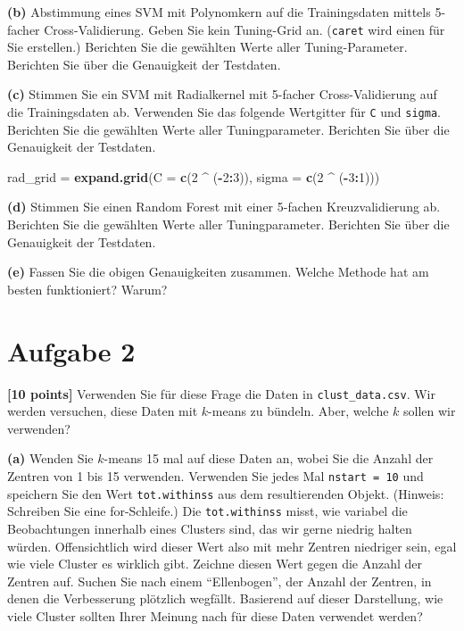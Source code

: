 \documentclass[]{article}
\newenvironment{Shaded}{\begin{snugshade}}{\end{snugshade}}
\newcommand{\DataTypeTok}[1]{\textcolor[rgb]{0.13,0.29,0.53}{#1}}
\newcommand{\DecValTok}[1]{\textcolor[rgb]{0.00,0.00,0.81}{#1}}
\newcommand{\KeywordTok}[1]{\textcolor[rgb]{0.13,0.29,0.53}{\textbf{#1}}}
\newcommand{\NormalTok}[1]{#1}
\newcommand{\OperatorTok}[1]{\textcolor[rgb]{0.81,0.36,0.00}{\textbf{#1}}}
\newcommand{\StringTok}[1]{\textcolor[rgb]{0.31,0.60,0.02}{#1}}
\begin{document}
\textbf{(b)} Abstimmung eines SVM mit Polynomkern auf die Trainingsdaten
mittels 5-facher Cross-Validierung. Geben Sie kein Tuning-Grid an.
(\texttt{caret} wird einen für Sie erstellen.) Berichten Sie die
gewählten Werte aller Tuning-Parameter. Berichten Sie über die
Genauigkeit der Testdaten.

\textbf{(c)} Stimmen Sie ein SVM mit Radialkernel mit 5-facher
Cross-Validierung auf die Trainingsdaten ab. Verwenden Sie das folgende
Wertgitter für \texttt{C} und \texttt{sigma}. Berichten Sie die
gewählten Werte aller Tuningparameter. Berichten Sie über die
Genauigkeit der Testdaten.

\begin{Shaded}
\begin{Highlighting}[]
\NormalTok{rad_grid =}\StringTok{ }\KeywordTok{expand.grid}\NormalTok{(}\DataTypeTok{C =} \KeywordTok{c}\NormalTok{(}\DecValTok{2} \OperatorTok{^}\StringTok{ }\NormalTok{(}\OperatorTok{-}\DecValTok{2}\OperatorTok{:}\DecValTok{3}\NormalTok{)), }\DataTypeTok{sigma  =} \KeywordTok{c}\NormalTok{(}\DecValTok{2} \OperatorTok{^}\StringTok{ }\NormalTok{(}\OperatorTok{-}\DecValTok{3}\OperatorTok{:}\DecValTok{1}\NormalTok{)))}
\end{Highlighting}
\end{Shaded}

\textbf{(d)} Stimmen Sie einen Random Forest mit einer 5-fachen
Kreuzvalidierung ab. Berichten Sie die gewählten Werte aller
Tuningparameter. Berichten Sie über die Genauigkeit der Testdaten.

\textbf{(e)} Fassen Sie die obigen Genauigkeiten zusammen. Welche
Methode hat am besten funktioniert? Warum?

\hypertarget{aufgabe-2}{%
\section{Aufgabe 2}\label{aufgabe-2}}

\textbf{{[}10 points{]}} Verwenden Sie für diese Frage die Daten in
\texttt{clust\_data.csv}. Wir werden versuchen, diese Daten mit
\(k\)-means zu bündeln. Aber, welche \(k\) sollen wir verwenden?

\textbf{(a)} Wenden Sie \(k\)-means 15 mal auf diese Daten an, wobei Sie
die Anzahl der Zentren von 1 bis 15 verwenden. Verwenden Sie jedes Mal
\texttt{nstart\ =\ 10} und speichern Sie den Wert \texttt{tot.withinss}
aus dem resultierenden Objekt. (Hinweis: Schreiben Sie eine
for-Schleife.) Die \texttt{tot.withinss} misst, wie variabel die
Beobachtungen innerhalb eines Clusters sind, das wir gerne niedrig
halten würden. Offensichtlich wird dieser Wert also mit mehr Zentren
niedriger sein, egal wie viele Cluster es wirklich gibt. Zeichne diesen
Wert gegen die Anzahl der Zentren auf. Suchen Sie nach einem
``Ellenbogen'', der Anzahl der Zentren, in denen die Verbesserung
plötzlich wegfällt. Basierend auf dieser Darstellung, wie viele Cluster
sollten Ihrer Meinung nach für diese Daten verwendet werden?
\end{document}
